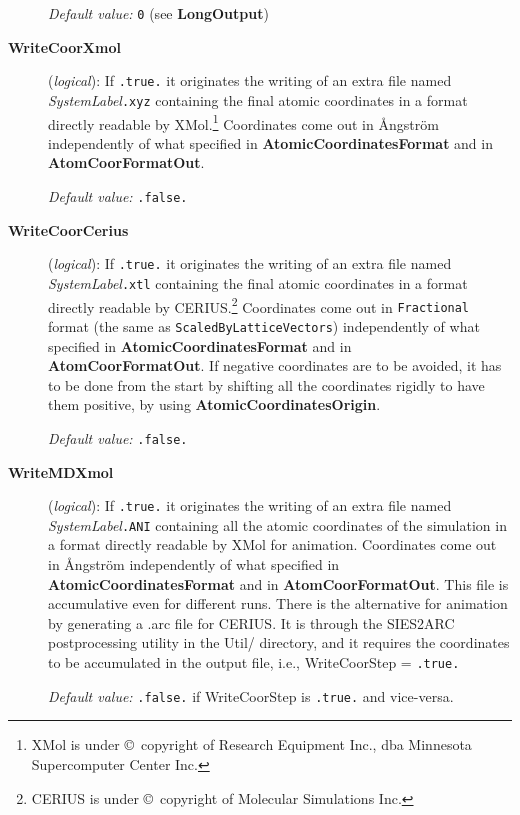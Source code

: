 \documentclass[11pt]{article}
\begin{document}
\begin{description}
{\it Default value:} {\tt 0} (see {\bf LongOutput})


\item[{\bf WriteCoorXmol}] ({\it logical}): 
If {\tt .true.} it originates the writing of an extra file
named {\it SystemLabel}{\tt .xyz} containing the final atomic
coordinates in a format directly readable by {\sc XMol}.\footnote{XMol
is under \copyright\ copyright of Research Equipment Inc., dba Minnesota
Supercomputer Center Inc.} Coordinates come out in {\AA}ngstr\"om
independently of what specified in {\bf AtomicCoordinatesFormat} and
in {\bf AtomCoorFormatOut}.

{\it Default value:} {\tt .false.}
        

\item[{\bf WriteCoorCerius}] ({\it logical}): 
If {\tt .true.} it originates the writing of an extra file
named {\it SystemLabel}{\tt .xtl} containing the final atomic
coordinates in a format directly readable by CERIUS.\footnote{CERIUS
is under \copyright\ copyright of Molecular Simulations Inc.} 
Coordinates come out in 
{\tt Fractional} format (the same as {\tt ScaledByLatticeVectors})
independently of what specified in {\bf AtomicCoordinatesFormat} and
in {\bf AtomCoorFormatOut}.
If negative coordinates are to be avoided, it has to be 
done from the start by shifting all the coordinates rigidly
to have them positive, by using {\bf AtomicCoordinatesOrigin}.

{\it Default value:} {\tt .false.}

 
\item[{\bf WriteMDXmol}] ({\it logical}):
If {\tt .true.} it originates the writing of an extra file
named {\it SystemLabel}{\tt .ANI} containing all the atomic
coordinates of the simulation in a format directly readable by 
{\sc XMol} for animation. Coordinates come out in 
{\AA}ngstr\"om independently of what specified in 
{\bf AtomicCoordinatesFormat} and in {\bf AtomCoorFormatOut}.
This file is accumulative even for different runs.
There is the alternative for animation by generating a .arc file for 
CERIUS. It is through the SIES2ARC postprocessing utility 
in the Util/ directory, and it requires the coordinates to be
accumulated in the output file, i.e., WriteCoorStep = {\tt .true.}
 
{\it Default value:} {\tt .false.} if WriteCoorStep is {\tt .true.}
and vice-versa.


\end{description}
\end{document}
